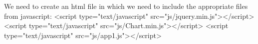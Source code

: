 We need to create an html file in which we need to include the appropriate files from javascript:\newline
<script type="text/javascript" src="js/jquery.min.js"></script>\newline
<script type="text/javascript" src="js/Chart.min.js"></script>\newline
<script type="text/javascript" src="js/app1.js"></script>\newline
\newline
